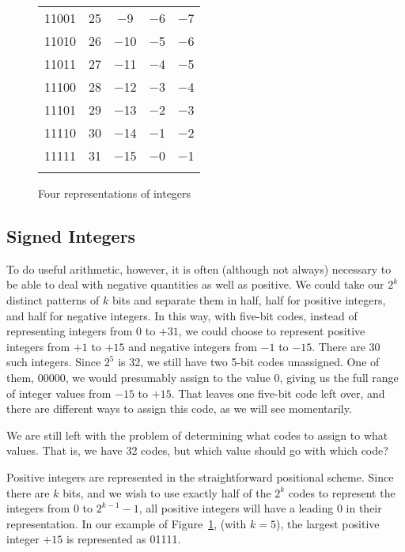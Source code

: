 \documentclass{patt}
\begin{document}
\begin{figure}
\begin{center}
\begin{tabular}{@{}lcccc@{}}
11001 &  25 &  $-$9 &     $-$6 &     $-$7  \\
11010 &  26 &  $-$10 &     $-$5 &     $-$6  \\
11011 &  27 &  $-$11 &     $-$4 &     $-$5  \\
11100 &  28 &  $-$12 &     $-$3 &     $-$4  \\
11101 &  29 &  $-$13 &     $-$2 &     $-$3  \\
11110 &  30 &  $-$14 &     $-$1 &     $-$2  \\
11111 &  31 &  $-$15 &     $-$0 &     $-$1 \\\botrule
\end{tabular}
\end{center}
\caption{Four representations of integers}
\label{fig:integers}
\vspace{-6pt}
\end{figure}

\subsection{Signed Integers}

To do useful arithmetic, however, it is often (although not always)
necessary to  be able to deal with negative
quantities as well as positive.  We could take our $2^k$ distinct
patterns of $k$ bits and separate them in half, half for positive
integers, and half for negative integers.  In this way, with five-bit
codes, instead of representing integers from 0 to ${+}31$, we could
choose to represent positive integers from ${+}1$ to ${+}15$ and
negative integers from ${-}1$ to ${-}15$.  There are 30 such integers.
Since $2^5$ is 32, we still have two 5-bit codes unassigned.  One of
them, 00000, we would presumably assign to the value 0, giving us the
full range of integer values from ${-}15$ to ${+}15$. That leaves one
five-bit code left over, and there are different ways to assign this code,
as we will see momentarily.

We are still left with the problem of determining what codes to assign
to what values. That is, we have 32 codes, but which value should go
with which code?

Positive integers are represented in the straightforward positional
scheme.  Since there are $k$ bits, and we wish to use exactly half of
the $2^k$ codes to represent the integers from 0 to $2^{k-1}-1$, all
positive integers will have a leading 0 in their representation.  In
our example of Figure~\ref{fig:integers}, (with $k=5$), the largest positive 
integer ${+}15$ is represented as 01111.
\end{document}
